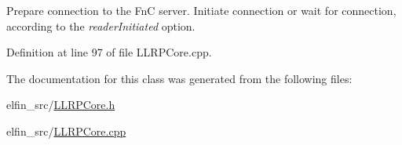 Prepare connection to the Fn\-C server. Initiate connection or wait for connection, according to the {\itshape reader\-Initiated} option. 



Definition at line 97 of file L\-L\-R\-P\-Core.\-cpp.



The documentation for this class was generated from the following files\-:\begin{DoxyCompactItemize}
\item 
elfin\-\_\-src/\hyperlink{_l_l_r_p_core_8h}{L\-L\-R\-P\-Core.\-h}\item 
elfin\-\_\-src/\hyperlink{_l_l_r_p_core_8cpp}{L\-L\-R\-P\-Core.\-cpp}\end{DoxyCompactItemize}
